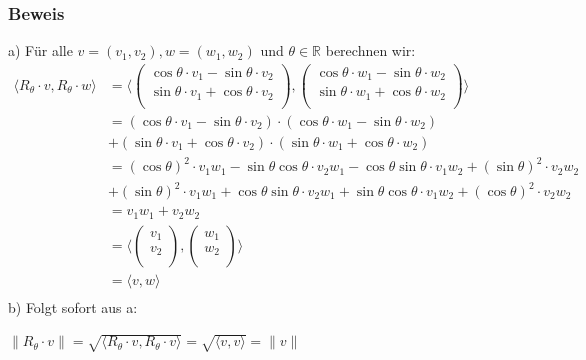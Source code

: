 \documentclass{article}
\begin{document}
\subsubsection*{Beweis}
a) Für alle $v=(v_1, v_2), w=(w_1, w_2)$ und $\theta \in \mathbb{R}$ berechnen wir: \\
\begin{align*}
    \langle R_\theta \cdot v, R_\theta \cdot w \rangle &= \langle \begin{pmatrix}
        \cos \theta \cdot v_1 - \sin \theta \cdot v_2 \\
        \sin \theta \cdot v_1 + \cos \theta \cdot v_2 \\
    \end{pmatrix}, \begin{pmatrix}
        \cos \theta \cdot w_1 - \sin \theta \cdot w_2 \\
        \sin \theta \cdot w_1 + \cos \theta \cdot w_2 \\
    \end{pmatrix} \rangle \\
    &= (\cos \theta \cdot v_1 - \sin \theta \cdot v_2) \cdot (\cos \theta \cdot w_1 - \sin \theta \cdot w_2) \\
    &+ (\sin \theta \cdot v_1 + \cos \theta \cdot v_2) \cdot (\sin \theta \cdot w_1 + \cos \theta \cdot w_2) \\
    &= (\cos \theta)^2 \cdot v_1 w_1 - \sin \theta \cos \theta \cdot v_2 w_1 - \cos \theta \sin \theta \cdot v_1 w_2 + (\sin \theta)^2 \cdot v_2 w_2 \\
    &+ (\sin \theta)^2 \cdot v_1 w_1 + \cos \theta \sin \theta \cdot v_2 w_1 + \sin \theta \cos \theta \cdot v_1 w_2 + (\cos \theta)^2 \cdot v_2 w_2 \\
    &= v_1 w_1 + v_2 w_2 \\
    &= \langle \begin{pmatrix}
        v_1 \\
        v_2 \\
    \end{pmatrix}, \begin{pmatrix}
        w_1 \\
        w_2 \\
    \end{pmatrix} \rangle \\
    &= \langle v,w \rangle \\
\end{align*}
b) Folgt sofort aus a: \\
\begin{center}
    $\|R_\theta \cdot v\| = \sqrt{\langle R_\theta \cdot v, R_\theta \cdot v \rangle} = \sqrt{\langle v,v \rangle} = \|v\|$
\end{center}
\end{document}
